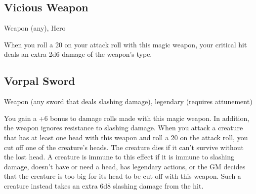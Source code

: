 \subsection{Vicious Weapon}
Weapon (any), Hero

When you roll a 20 on your attack roll with this magic weapon, your critical hit deals an extra 2d6 damage of the weapon's type.

\subsection{Vorpal Sword}
Weapon (any sword that deals slashing damage), legendary (requires attunement) 

You gain a +6 bonus to damage rolls made with this magic weapon. In addition, the weapon ignores resistance to slashing damage.  When you attack a creature that has at least one head with this weapon and roll a 20 on the attack roll, you cut off one of the creature's heads. The creature dies if it can't survive without the lost head. A creature is immune to this effect if it is immune to slashing damage, doesn't have or need a head, has legendary actions, or the GM decides that the creature is too big for its head to be cut off with this weapon. Such a creature instead takes an extra 6d8 slashing damage from the hit.